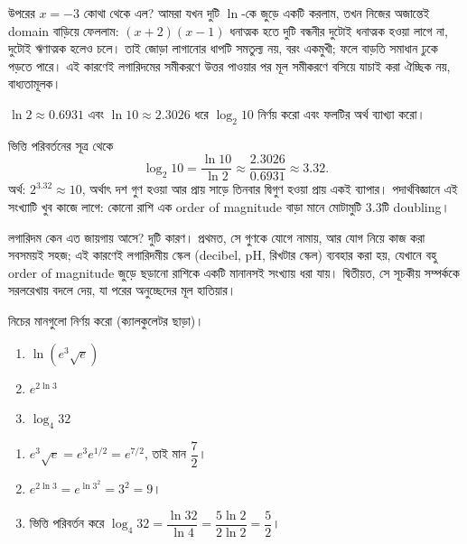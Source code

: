 \documentclass[11pt]{article}
\begin{document}
\begin{remark}
উপরের $x = -3$ কোথা থেকে এল? আমরা যখন দুটি $\ln$-কে জুড়ে একটি করলাম, তখন
নিজের অজান্তেই domain বাড়িয়ে ফেললাম: $(x+2)(x-1)$ ধনাত্মক হতে দুটি বন্ধনীর
দুটোই ধনাত্মক হওয়া লাগে না, দুটোই ঋণাত্মক হলেও চলে। তাই জোড়া লাগানোর ধাপটি
সমতুল্য নয়, বরং একমুখী; ফলে বাড়তি সমাধান ঢুকে পড়তে পারে। এই কারণেই লগারিদমের
সমীকরণে উত্তর পাওয়ার পর মূল সমীকরণে বসিয়ে যাচাই করা ঐচ্ছিক নয়, বাধ্যতামূলক।
\end{remark}

\begin{example}
$\ln 2 \approx 0.6931$ এবং $\ln 10 \approx 2.3026$ ধরে $\log_{2} 10$ নির্ণয় করো
এবং ফলটির অর্থ ব্যাখ্যা করো।
\end{example}

\begin{solbox}
ভিত্তি পরিবর্তনের সূত্র থেকে
\[
  \log_{2} 10 = \frac{\ln 10}{\ln 2} \approx \frac{2.3026}{0.6931} \approx 3.32 .
\]
অর্থ: $2^{3.32} \approx 10$, অর্থাৎ দশ গুণ হওয়া আর প্রায় সাড়ে তিনবার দ্বিগুণ
হওয়া প্রায় একই ব্যাপার। পদার্থবিজ্ঞানে এই সংখ্যাটি খুব কাজে লাগে: কোনো রাশি
এক order of magnitude বাড়া মানে মোটামুটি $3.3$টি doubling।
\end{solbox}

\begin{remark}
লগারিদম কেন এত জায়গায় আসে? দুটি কারণ। প্রথমত, সে গুণকে যোগে নামায়, আর যোগ
নিয়ে কাজ করা সবসময়ই সহজ; এই কারণেই লগারিদমীয় স্কেল (decibel, pH, রিখটার
স্কেল) ব্যবহার করা হয়, যেখানে বহু order of magnitude জুড়ে ছড়ানো রাশিকে একটি
মানানসই সংখ্যায় ধরা যায়। দ্বিতীয়ত, সে সূচকীয় সম্পর্ককে সরলরেখায় বদলে দেয়,
যা পরের অনুচ্ছেদের মূল হাতিয়ার।
\end{remark}

 নিচের মানগুলো নির্ণয় করো (ক্যালকুলেটর ছাড়া)।
\begin{enumerate}
  \item $\ln \left( e^{3} \sqrt{e} \right)$
  \item $e^{2 \ln 3}$
  \item $\log_{4} 32$
\end{enumerate}

\begin{sol}
\begin{enumerate}
  \item $e^{3}\sqrt{e} = e^{3} e^{1/2} = e^{7/2}$, তাই মান $\dfrac{7}{2}$।
  \item $e^{2\ln 3} = e^{\ln 3^{2}} = 3^{2} = 9$।
  \item ভিত্তি পরিবর্তন করে
        $\log_{4} 32 = \dfrac{\ln 32}{\ln 4} = \dfrac{5 \ln 2}{2 \ln 2}
        = \dfrac{5}{2}$।
\end{enumerate}
\end{sol}
\end{document}
